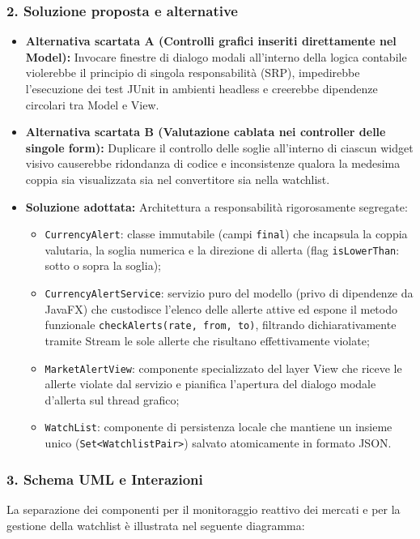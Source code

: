 \documentclass[11pt,a4paper,openright]{report}
\begin{document}
\subsubsection*{2. Soluzione proposta e alternative}
\begin{itemize}
  \item \textbf{Alternativa scartata A (Controlli grafici inseriti direttamente nel Model):} Invocare finestre di dialogo modali all'interno della logica contabile violerebbe il principio di singola responsabilità (SRP), impedirebbe l'esecuzione dei test JUnit in ambienti headless e creerebbe dipendenze circolari tra Model e View.
  \item \textbf{Alternativa scartata B (Valutazione cablata nei controller delle singole form):} Duplicare il controllo delle soglie all'interno di ciascun widget visivo causerebbe ridondanza di codice e inconsistenze qualora la medesima coppia sia visualizzata sia nel convertitore sia nella watchlist.
  \item \textbf{Soluzione adottata:} Architettura a responsabilità rigorosamente segregate:
  \begin{itemize}
    \item \texttt{CurrencyAlert}: classe immutabile (campi \texttt{final}) che incapsula la coppia valutaria, la soglia numerica e la direzione di allerta (flag \texttt{isLowerThan}: sotto o sopra la soglia);
    \item \texttt{CurrencyAlertService}: servizio puro del modello (privo di dipendenze da JavaFX) che custodisce l'elenco delle allerte attive ed espone il metodo funzionale \texttt{checkAlerts(rate, from, to)}, filtrando dichiarativamente tramite Stream le sole allerte che risultano effettivamente violate;
    \item \texttt{MarketAlertView}: componente specializzato del layer View che riceve le allerte violate dal servizio e pianifica l'apertura del dialogo modale d'allerta sul thread grafico;
    \item \texttt{WatchList}: componente di persistenza locale che mantiene un insieme unico (\texttt{Set<WatchlistPair>}) salvato atomicamente in formato JSON.
  \end{itemize}
\end{itemize}

\subsubsection*{3. Schema UML e Interazioni}
La separazione dei componenti per il monitoraggio reattivo dei mercati e per la gestione della watchlist è illustrata nel seguente diagramma:
\end{document}
